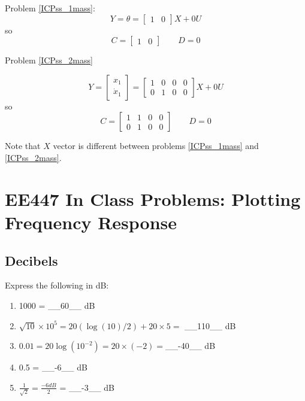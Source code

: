 \documentclass{article}	%
\newcommand{\EEcourse}{EE447 }
\begin{document}
\begin{solution}
Problem \ref{ICPss_1mass}:
\[
Y = \theta = \begin{bmatrix}1&0\end{bmatrix}X + 0 U
\]
so
\[
C = \begin{bmatrix}1&0\end{bmatrix}  \qquad D = 0
\]

\noindent
Problem \ref{ICPss_2mass}

\[
Y = \begin{bmatrix}x_1\\\dot{x}_1\end{bmatrix} = \begin{bmatrix}1&0&0&0 \\ 0&1&0&0\end{bmatrix}X + 0 U
\]
so
\[
C = \begin{bmatrix}1&1&0&0 \\ 0&1&0&0\end{bmatrix}  \qquad D = 0
\]
\end{solution}
Note that $X$ vector is different between problems  \ref{ICPss_1mass} and \ref{ICPss_2mass}.




\newpage
\section{\EEcourse In Class Problems: Plotting Frequency Response}
\subsection{Decibels}


%
%
\begin{solution}
Express the following in dB:
\begin{enumerate}
	\item 1000 = \_\_60\_\_ dB
	\item $\sqrt{10}\times10^5 = 20 \left ( \log(10)/2 \right) + 20\times 5 = $ \_\_110\_\_ dB
	\item $0.01 =20\log(10^{-2}) = 20\times(-2) = $\_\_-40\_\_ dB
	\item 0.5 = \_\_-6\_\_ dB
	\item $\frac{1}{\sqrt{2}} = \frac{-6dB}{2}$ = \_\_-3\_\_ dB
\end{enumerate}

\end{solution}
\end{document}
